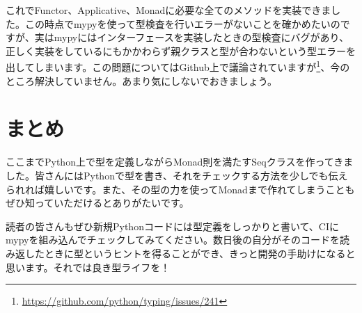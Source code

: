 
これでFunctor、Applicative、Monadに必要な全てのメソッドを実装できました。この時点でmypyを使って型検査を行いエラーがないことを確かめたいのですが、実はmypyにはインターフェースを実装したときの型検査にバグがあり、正しく実装をしているにもかかわらず親クラスと型が合わないという型エラーを出してしまいます。この問題についてはGithub上で議論されていますが\footnote{\url{https://github.com/python/typing/issues/241}}、今のところ解決していません。あまり気にしないでおきましょう。

\section{まとめ}
ここまでPython上で型を定義しながらMonad則を満たすSeqクラスを作ってきました。皆さんにはPythonで型を書き、それをチェックする方法を少しでも伝えられれば嬉しいです。また、その型の力を使ってMonadまで作れてしまうこともぜひ知っていただけるとありがたいです。

読者の皆さんもぜひ新規Pythonコードには型定義をしっかりと書いて、CIにmypyを組み込んでチェックしてみてください。数日後の自分がそのコードを読み返したときに型というヒントを得ることができ、きっと開発の手助けになると思います。それでは良き型ライフを！